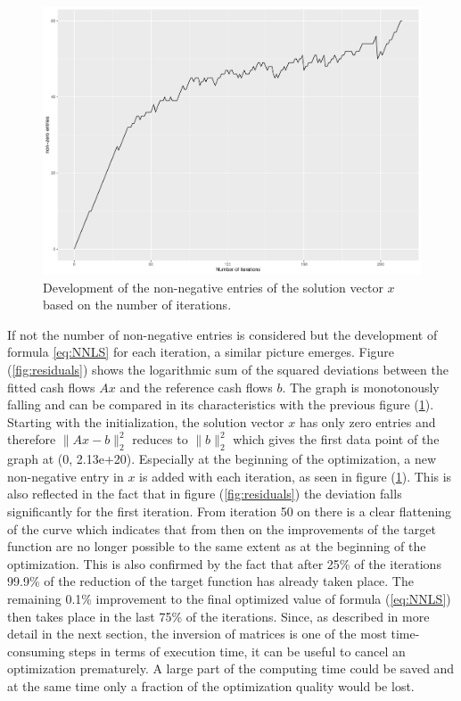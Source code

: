 \begin{figure}
	\centering
	\includegraphics[width=\textwidth]{figures/chapter_NNLS/number_iterations}
	\caption{Development of the non-negative entries of the solution vector $x$ based on the number of iterations.}
	\label{fig:iterations}
\end{figure}

If not the number of non-negative entries is considered but the development of formula \ref{eq:NNLS} for each iteration, a similar picture emerges. Figure (\ref{fig:residuals}) shows the logarithmic sum of the squared deviations between the fitted cash flows $Ax$ and the reference cash flows $b$. The graph is monotonously falling and can be compared in its characteristics with the previous figure (\ref{fig:iterations}). Starting with the initialization, the solution vector $x$ has only zero entries and therefore $\lVert Ax -b \rVert_2^2$ reduces to $\lVert b \rVert_2^2$ which gives the first data point of the graph at (0, 2.13e+20). Especially at the beginning of the optimization, a new non-negative entry in $x$ is added with each iteration, as seen in figure (\ref{fig:iterations}). This is also reflected in the fact that in figure (\ref{fig:residuals}) the deviation falls significantly for the first iteration. From iteration 50 on there is a clear flattening of the curve which indicates that from then on the improvements of the target function are no longer possible to the same extent as at the beginning of the optimization. This is also confirmed by the fact that after 25\% of the iterations 99.9\% of the reduction of the target function has already taken place. The remaining 0.1\% improvement to the final optimized value of formula (\ref{eq:NNLS}) then takes place in the last 75\% of the iterations. Since, as described in more detail in the next section, the inversion of matrices is one of the most time-consuming steps in terms of execution time, it can be useful to cancel an optimization prematurely.  A large part of the computing time could be saved and at the same time only a fraction of the optimization quality would be lost. 

